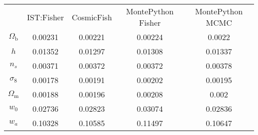 \begin{table}
\centering
\begin{tabular}{|c|c|c|c|c|}
 & IST:Fisher & CosmicFish & MontePython Fisher & MontePython MCMC \\
$\Omega_\mathrm{b}$ & 0.00231 & 0.00221 & 0.00224 & 0.0022 \\
$h$ & 0.01352 & 0.01297 & 0.01308 & 0.01337 \\
$n_s$ & 0.00371 & 0.00372 & 0.00372 & 0.00378 \\
$\sigma_8$ & 0.00178 & 0.00191 & 0.00202 & 0.00195 \\
$\Omega_\mathrm{m}$ & 0.00188 & 0.00196 & 0.00208 & 0.002 \\
$w_0$ & 0.02736 & 0.02823 & 0.03074 & 0.02836 \\
$w_a$ & 0.10328 & 0.10585 & 0.11497 & 0.10647 \\
\end{tabular}
\end{table}
